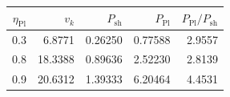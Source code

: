\begin{ruledtabular}
\begin{tabular}{rrrrr}
$\eta_{\mathrm{Pl}}$ & $v_k$ & $P_{\mathrm{sh}}$ & $P_{\mathrm{Pl}}$ & $P_{\mathrm{Pl}}/P_{\mathrm{sh}}$ \\
\hline
0.3 & 6.8771 & 0.26250 & 0.77588 & 2.9557 \\
0.8 & 18.3388 & 0.89636 & 2.52230 & 2.8139 \\
0.9 & 20.6312 & 1.39333 & 6.20464 & 4.4531 \\
\end{tabular}
\end{ruledtabular}
